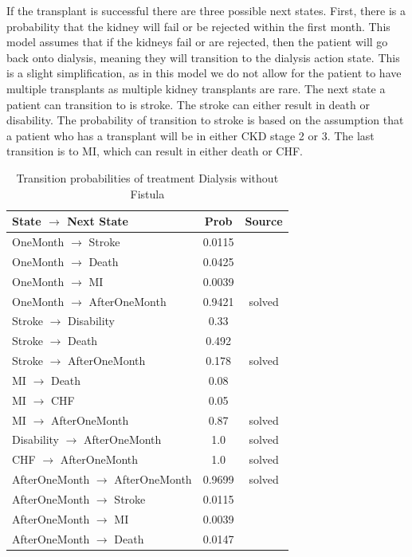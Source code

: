 \documentclass[10pt,twocolumn]{article}
\begin{document}
If the transplant is successful there are three possible next states. First, there is a probability that the kidney will fail or be rejected within the first month. This model assumes that if the kidneys fail or are rejected, then the patient will go back onto dialysis, meaning they will transition to the dialysis action state. This is a slight simplification, as in this model we do not allow for the patient to have multiple transplants as multiple kidney transplants are rare. The next state a patient can transition to is stroke. The stroke can either result in death or disability. The probability of transition to stroke is based on the assumption that a patient who has a transplant will be in either CKD stage 2 or 3. The last transition is to MI, which can result in either death or CHF.

\begin{table}[ht]
  \centering
  \caption{Transition probabilities of treatment Dialysis without Fistula}
  \label{tab:trans3}
  \begin{tabularx}{\columnwidth}{X c c} 
      \toprule
 State \(\rightarrow\) Next State & Prob & Source \\ 
      \midrule
 OneMonth \(\rightarrow\) Stroke & 0.0115 & \cite{Stroke} \\
 OneMonth \(\rightarrow\) Death & 0.0425 & \cite{ckdmodel} \\
 OneMonth \(\rightarrow\) MI & 0.0039 & \cite{long-term} \\
 OneMonth \(\rightarrow\) AfterOneMonth & 0.9421 & solved \\

 Stroke \(\rightarrow\) Disability & 0.33 & \cite{ckdmodel} \\
 Stroke \(\rightarrow\) Death & 0.492 & \cite{long-term} \\
 Stroke \(\rightarrow\) AfterOneMonth & 0.178 & solved \\

 MI \(\rightarrow\) Death & 0.08 & \cite{ckdmodel} \\
 MI \(\rightarrow\) CHF & 0.05 & \cite{ckdmodel} \\
 MI \(\rightarrow\) AfterOneMonth & 0.87 & solved \\

 Disability \(\rightarrow\) AfterOneMonth & 1.0 & solved \\
 CHF \(\rightarrow\) AfterOneMonth & 1.0 & solved \\

 AfterOneMonth \(\rightarrow\) AfterOneMonth & 0.9699 & solved \\
 AfterOneMonth \(\rightarrow\) Stroke & 0.0115 & \cite{Stroke} \\
 AfterOneMonth \(\rightarrow\) MI & 0.0039 & \cite{long-term} \\
 AfterOneMonth \(\rightarrow\) Death & 0.0147 & \cite{ckdmodel} \\


\end{tabularx}
\end{table}
\end{document}
